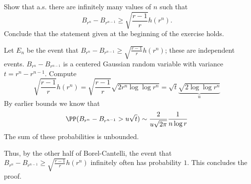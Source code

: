 \documentclass{scrartcl}
\begin{document}


\begin{prob}
    Show that a.s. there are infinitely many values of $n$ such that
    \[
        B_{r^n} - B_{r^{n-1}} \geq \sqrt{\frac{r-1}{r}} h(r^{n}).
    \]
    Conclude that the statement given at the beginning of the exercise holds.
\end{prob}

Let $E_n$ be the event that $B_{r^n} - B_{r^{n-1}} \geq \sqrt{\frac{r-1}{r}} h(r^n)$; these are independent events. $B_{r^n} - B_{r^{n-1}}$ is a centered Gaussian random variable with variance $t = r^n - r^{n-1}$. Compute
\[
    \sqrt{\frac{r-1}{r}} h(r^n) = \sqrt{\frac{r-1}{r}} \sqrt{2r^{n}\log\log r^{n}} = \sqrt{t} \underbrace{\sqrt{2\log\log r^n}}_u
\]
By earlier bounds we know that
\[
    \PP(B_{r^n} - B_{r^{n-1}} > u\sqrt{t}) \sim \frac{2}{u\sqrt{2\pi}} \frac{1}{n\log r}
\]
The sum of these probabilities is unbounded.

Thus, by the other half of Borel-Cantelli, the event that $B_{r^n} - B_{r^{n-1}} \geq \sqrt{\frac{r-1}{r}} h(r^n)$ infinitely often has probability $1$. This concludes the proof.
\end{document}
